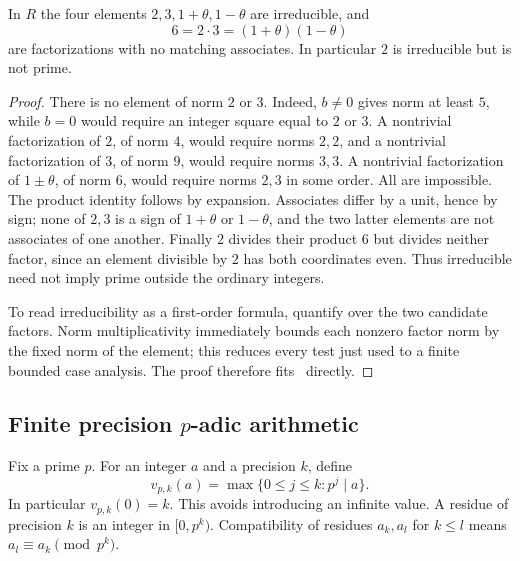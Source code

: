 \begin{theorem}\label{ag:nonufd}
In $R$ the four elements $2,3,1+\theta,1-\theta$ are irreducible, and
\[
 6=2\cdot3=(1+\theta)(1-\theta)
\]
are factorizations with no matching associates. In particular $2$ is irreducible but is not prime.
\end{theorem}
\begin{proof}
There is no element of norm $2$ or $3$. Indeed, $b\ne0$ gives norm at least $5$, while $b=0$ would require an integer square equal to $2$ or $3$. A nontrivial factorization of $2$, of norm $4$, would require norms $2,2$, and a nontrivial factorization of $3$, of norm $9$, would require norms $3,3$. A nontrivial factorization of $1\pm\theta$, of norm $6$, would require norms $2,3$ in some order. All are impossible. The product identity follows by expansion. Associates differ by a unit, hence by sign; none of $2,3$ is a sign of $1+\theta$ or $1-\theta$, and the two latter elements are not associates of one another. Finally $2$ divides their product $6$ but divides neither factor, since an element divisible by $2$ has both coordinates even. Thus irreducible need not imply prime outside the ordinary integers.

To read irreducibility as a first-order formula, quantify over the two candidate factors. Norm multiplicativity immediately bounds each nonzero factor norm by the fixed norm of the element; this reduces every test just used to a finite bounded case analysis. The proof therefore fits \ipra\ directly.
\end{proof}

\subsection{Finite precision \texorpdfstring{$p$}{p}-adic arithmetic}
Fix a prime $p$. For an integer $a$ and a precision $k$, define
\[
 v_{p,k}(a)=\max\{0\le j\le k:p^j\mid a\}.
\]
In particular $v_{p,k}(0)=k$. This avoids introducing an infinite value. A residue of precision $k$ is an integer in $[0,p^k)$. Compatibility of residues $a_k,a_l$ for $k\le l$ means $a_l\equiv a_k\pmod{p^k}$.

